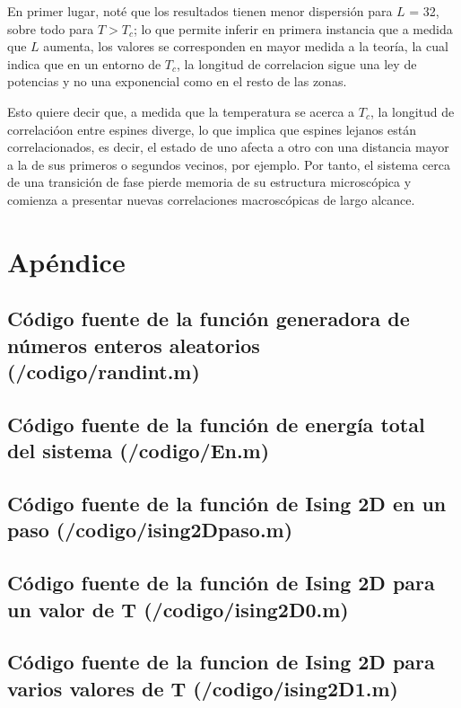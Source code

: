 \documentclass[a4paper,12pt]{article}
\begin{document}
En primer lugar, not\'e que los resultados tienen menor dispersi\'on para $L$ = 32, sobre todo para $T > T_{c}$; lo que permite inferir en primera instancia que a medida que $L$ aumenta, los valores se corresponden en mayor medida a la teor\'ia, la cual indica que en un entorno de $T_{c}$, la longitud de correlacion sigue una ley de potencias y no una exponencial como en el resto de las zonas.

Esto quiere decir que, a medida que la temperatura se acerca a $T_{c}$, la longitud de correlaci\'oon entre espines diverge, lo que implica que espines lejanos est\'an correlacionados, es decir, el estado de uno afecta a otro con una distancia mayor a la de sus primeros o segundos vecinos, por ejemplo. Por tanto, el sistema cerca de una transici\'on 
de fase pierde memoria de su estructura microsc\'opica y comienza a presentar nuevas correlaciones macrosc\'opicas de largo alcance.


\section{Ap\'endice}

\subsection{C\'odigo fuente de la funci\'on generadora de n\'umeros enteros aleatorios (/codigo/randint.m)}



\subsection{C\'odigo fuente de la funci\'on de energ\'ia total del sistema (/codigo/En.m)}



\subsection{C\'odigo fuente de la funci\'on de Ising 2D en un paso (/codigo/ising2Dpaso.m)}



\subsection{C\'odigo fuente de la funci\'on de Ising 2D para un valor de T (/codigo/ising2D0.m)}



\subsection{C\'odigo fuente de la funcion de Ising 2D para varios valores de T (/codigo/ising2D1.m)}


\end{document}

